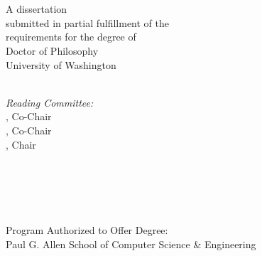 
\begin{titlepage}
\begin{center}
\vspace*{\fill}
\singlespace
\thispagestyle{empty}
{\LARGE { \thesisTitle \\} %
\doublespacing
\vspace*{\baselineskip}
{\large \authorName }\\ %
\vspace*{1.5\baselineskip}
\large A dissertation
\\ submitted in partial fulfillment of the\\
requirements for the degree of\\
\vspace*{\baselineskip}
Doctor of Philosophy\\
\vspace{1.5\baselineskip}
University of Washington
\\ \graduationYear}\\ %
\vspace{1.5\baselineskip}

\large \textit{Reading Committee:} \\

\ifdefined\secondAdvisor 
    \advisor, Co-Chair \\
    \secondAdvisor, Co-Chair \\
\else
    \advisor, Chair
\fi

\readingCommitteeOne \\

\ifdefined\readingCommitteeTwo
    \readingCommitteeTwo \\
\fi

\ifdefined\readingCommitteeThree
    \readingCommitteeThree \\
\fi
    

\vspace{2\baselineskip}
  Program Authorized to Offer Degree: \\
Paul G. Allen School of Computer Science \& Engineering
  

  
  
  \vspace*{\fill}
  \clearpage
  \thispagestyle{empty}
\end{center}
\end{titlepage}

